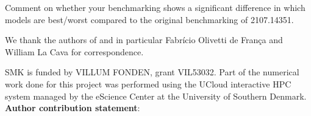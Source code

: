 \documentclass[a4paper,11pt]{article}
\begin{document}
	Comment on whether your benchmarking shows a significant difference in which models are best/worst compared to the original benchmarking of 2107.14351.




	
	\vspace{6pt} 
\begin{acknowledgments}
	We thank the authors of \cite{benchmark} and in particular Fabrício Olivetti de França and William La Cava for correspondence.
	
	SMK is funded by VILLUM FONDEN, grant VIL53032. Part of the numerical work done for this project was performed using the UCloud interactive HPC system managed by the eScience Center at the University of Southern Denmark.
	\newline\newline
	{\bf Author contribution statement}:
\end{acknowledgments}
	
	
	
	

\end{document}
